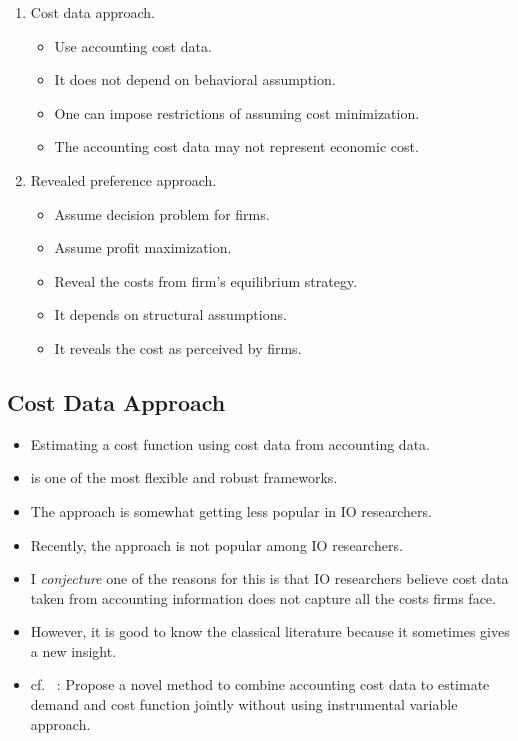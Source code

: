 \documentclass[
]{book}
\providecommand{\tightlist}{%
  \setlength{\itemsep}{0pt}\setlength{\parskip}{0pt}}
\begin{document}
\begin{enumerate}
\def\labelenumi{\arabic{enumi}.}
\tightlist
\item
  Cost data approach.

  \begin{itemize}
  \tightlist
  \item
    Use accounting cost data.
  \item
    It does not depend on behavioral assumption.
  \item
    One can impose restrictions of assuming cost minimization.
  \item
    The accounting cost data may not represent economic cost.
  \end{itemize}
\item
  Revealed preference approach.

  \begin{itemize}
  \tightlist
  \item
    Assume decision problem for firms.
  \item
    Assume profit maximization.
  \item
    Reveal the costs from firm's equilibrium strategy.
  \item
    It depends on structural assumptions.
  \item
    It reveals the cost as perceived by firms.
  \end{itemize}
\end{enumerate}

\hypertarget{cost-data-approach}{%
\subsection{Cost Data Approach}\label{cost-data-approach}}

\begin{itemize}
\tightlist
\item
  Estimating a cost function using cost data from accounting data.
\item
  \citet{McElroy1987} is one of the most flexible and robust frameworks.
\item
  The approach is somewhat getting less popular in IO researchers.
\item
  Recently, the approach is not popular among IO researchers.
\item
  I \textit{conjecture} one of the reasons for this is that IO researchers believe cost data taken from accounting information does not capture all the costs firms face.
\item
  However, it is good to know the classical literature because it sometimes gives a new insight.
\item
  cf.~\citet{Byrne2015} : Propose a novel method to combine accounting cost data to estimate demand and cost function jointly without using instrumental variable approach.
\end{itemize}
\end{document}

